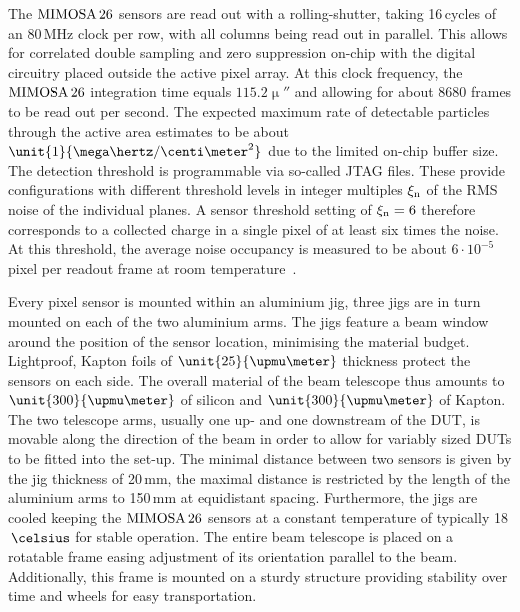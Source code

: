 The $\textrm{MIMOSA\,26}$ sensors are read out with a rolling-shutter, taking 16\,cycles of an 80\,MHz clock per row, with all columns being read out in parallel. 
This allows for correlated double sampling and zero suppression on-chip with the digital circuitry placed outside the active pixel array. 
At this clock frequency, the $\textrm{MIMOSA\,26}$ integration time equals $\unit{115.2}{\upmu\second}$ and allowing for about 8680 frames to be read out per second. 
The expected maximum rate of detectable particles through the active area estimates to be about $\unit{1}{\mega\hertz/\centi\meter^2}$ due to the limited on-chip buffer size. 
The detection threshold is programmable via so-called JTAG files. 
These provide configurations with different threshold levels in integer multiples $\xi_{\textrm{n}}$ of the RMS noise of the individual planes. 
A sensor threshold setting of $\xi_{\textrm{n}} = 6$ therefore corresponds to a collected charge in a single pixel of at least six times the noise. 
At this threshold, the average noise occupancy is measured to be about $6\cdot10^{-5}$ pixel per readout frame at room temperature~\cite{ref:mimosa26}.

Every pixel sensor is mounted within an aluminium jig, three jigs are in turn mounted on each of the two aluminium arms. 
The jigs feature a beam window around the position of the sensor location, minimising the material budget. 
Lightproof, Kapton foils of $\unit{25}{\upmu\meter}$ thickness protect the sensors on each side.
The overall material of the beam telescope thus amounts to $\unit{300}{\upmu\meter}$ of silicon and $\unit{300}{\upmu\meter}$ of Kapton. 
The two telescope arms, usually one up- and one downstream of the DUT, is movable along the direction of the beam in order to allow for variably sized DUTs to be fitted into the set-up. 
The minimal distance between two sensors is given by the jig thickness of 20\,mm, the maximal distance is restricted by the length of the aluminium arms to 150\,mm at equidistant spacing.
Furthermore, the jigs are cooled keeping the $\textrm{MIMOSA\,26}$ sensors at a constant temperature of typically 18$\,\celsius$ for stable operation.
The entire beam telescope is placed on a rotatable frame easing adjustment of its orientation parallel to the beam. 
Additionally, this frame is mounted on a sturdy structure providing stability over time and wheels for easy transportation. 

